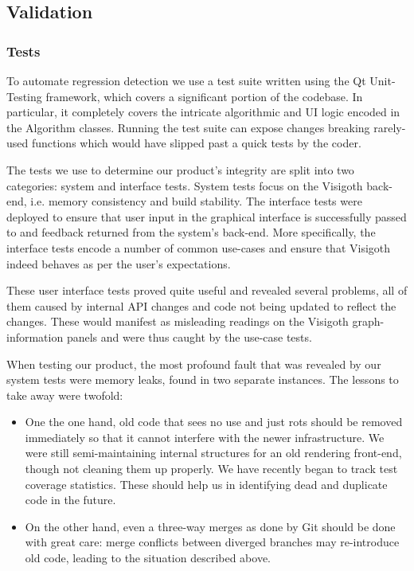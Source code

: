 \documentclass[a4paper,11pt,titlepage]{article}
\begin{document}
\subsection{Validation}

\subsubsection{Tests}
To automate regression detection we use a test suite written using
the Qt Unit-Testing framework, which covers a significant portion
of the codebase. In particular, it completely covers the intricate
algorithmic and UI logic encoded in the Algorithm classes. Running
the test suite can expose changes breaking rarely-used functions
which would have slipped past a quick tests by the coder.

The tests we use to determine our product's integrity are split
into two categories: system and interface tests. System tests focus
on the Visigoth back-end, i.e. memory consistency and build stability.
The interface tests were deployed to ensure that user input in the
graphical interface is successfully passed to and feedback returned
from the system's back-end. More specifically, the interface tests
encode a number of common use-cases and ensure that Visigoth indeed
behaves as per the user's expectations.

These user interface tests proved quite useful and revealed several
problems, all of them caused by internal API changes and code not
being updated to reflect the changes. These would manifest as
misleading readings on the Visigoth graph-information panels and
were thus caught by the use-case tests.

When testing our product, the most profound fault that was revealed
by our system tests were memory leaks, found in two separate
instances. The lessons to take away were twofold:
\begin{itemize}
  \item One the one hand, old code that sees no use and just rots
        should be removed immediately so that it cannot interfere
        with the newer infrastructure. We were still semi-maintaining
        internal structures for an old rendering front-end, though
        not cleaning them up properly. We have recently began to
        track test coverage statistics. These should help us in
        identifying dead and duplicate code in the future.
  \item On the other hand, even a three-way merges as done by Git
        should be done with great care: merge conflicts between
        diverged branches may re-introduce old code, leading to
        the situation described above.
\end{itemize}
\end{document}
